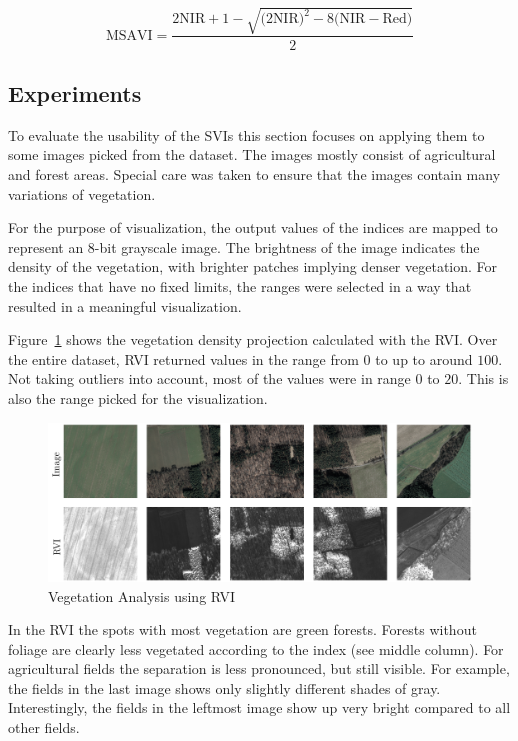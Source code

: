 \begin{equation}
    \displaystyle
    \text{MSAVI} = \frac
    {
    2 \text{NIR} + 1
    - \sqrt{
    \big(2 \text{NIR}\big)^2
    - 8 \big(\text{NIR} - \text{Red}\big)
    }
    }
    {2}
    \label{eq:msavi}
\end{equation}

\subsection{Experiments}
To evaluate the usability of the SVIs this section focuses on applying them to some images picked from the dataset. The images mostly consist of agricultural and forest areas. Special care was taken to ensure that the images contain many variations of vegetation.

For the purpose of visualization, the output values of the indices are mapped to represent an 8-bit grayscale image. The brightness of the image indicates the density of the vegetation, with brighter patches implying denser vegetation. For the indices that have no fixed limits, the ranges were selected in a way that resulted in a meaningful visualization.

Figure~\ref{fig:vegetation_rvi_examples} shows the vegetation density projection calculated with the RVI. Over the entire dataset, RVI returned values in the range from $0$ to up to around $100$. Not taking outliers into account, most of the values were in range $0$ to $20$. This is also the range picked for the visualization.

\begin{figure}[h]
    \centering
    \includegraphics[width=\textwidth]{images/vegetation/evi}
    \caption{Vegetation Analysis using RVI}
    \label{fig:vegetation_rvi_examples}
\end{figure}

In the RVI the spots with most vegetation are green forests. Forests without foliage are clearly less vegetated according to the index (see middle column). For agricultural fields the separation is less pronounced, but still visible. For example, the fields in the last image shows only slightly different shades of gray. Interestingly, the fields in the leftmost image show up very bright compared to all other fields.


